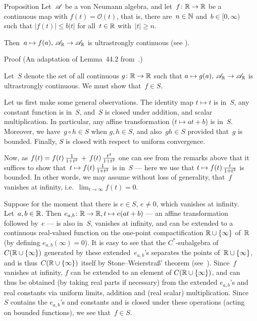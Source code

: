 \documentclass[a]{subfiles}
\begin{document}
\begin{parsec}%
\begin{point}{Proposition}%
Let~$\mathscr{A}$ be a von Neumann algebra,
and let~$f\colon \mathbb{R}\to\mathbb{R}$ be a continuous map 
with $f(t)=\mathcal{O}(t)$,
that is,
there are~$n\in \mathbb{N}$ and~$b\in [0,\infty)$
such that $\left|f(t)\right|\leq b\left|t\right|$
for all~$t\in \mathbb{R}$ with~$\left|t\right| \geq n$.

Then~$a\mapsto f(a),\,\mathscr{A}_{\mathbb{R}}\to\mathscr{A}_{\mathbb{R}}$ is ultrastrongly continuous
(see ).
\begin{point}{Proof}%
(An adaptation of Lemma~44.2 from~\cite{conway2000}.)

Let~$S$ denote the set of all continuous $g\colon \mathbb{R}\to\mathbb{R}$
such that $a\mapsto g(a),\,\mathscr{A}_{\mathbb{R}}\to\mathscr{A}_{\mathbb{R}}$
is ultrastrongly continuous.
We must show that~$f\in S$.

Let us first make some general observations.
The identity map $t\mapsto t$ is in~$S$,
any constant function is in~$S$,
and~$S$ is closed under addition,
and scalar multiplication.
In particular, any affine transformation ($t\mapsto at+b$)
is in~$S$.
Moreover, we have~$g\circ h\in S$ when $g,h\in S$,
and also~$gh\in S$
provided that~$g$ is bounded.
Finally, $S$ is closed with respect to uniform convergence.

Now,
as $f(t)=f(t)\,\smash{\frac{1}{1+t^2}\,+\, f(t)\,\frac{t^2}{1+t^2}}$
 one can see from the remarks above
that it suffices
to show
that~$t\mapsto f(t)\,\smash{\frac{1}{1+t^2}}$ is in~$S$
--- here we use that $t\mapsto f(t) \,\smash{\frac{t}{1+t^2}}$ is bounded.
In other words,
we may assume without loss of generality,
that~$f$ vanishes at infinity, i.e.~$\lim_{t\to \infty}f(t)=0$.

Suppose for the moment
that there is $e\in S$, $e\neq 0$,
which vanishes at infinity.
Let~$a,b\in \mathbb{R}$.
Then $e_{a,b}\colon \mathbb{R}\to\mathbb{R}, t\mapsto e(at+b)$
--- an affine transformation followed by~$e$ ---
is also in~$S$,
vanishes at infinity,
and can be extended to a continuous real-valued
function on the one-point compactification $\mathbb{R}\cup \{ \infty\}$
of~$\mathbb{R}$
(by defining $e_{a,b}(\infty)=0$).
It is easy to see that the $C^*$-subalgebra
of~$C(\mathbb{R}\cup\{\infty\})$
generated by these extended~$e_{a,b}$'s 
separates the points of~$\mathbb{R}\cup\{\infty\}$,
and is thus~$C(\mathbb{R}\cup\{\infty\})$ itself
by Stone--Weierstra\ss' theorem (see~).
Since~$f$ vanishes at infinity,
$f$ can be extended to an element of $C(\mathbb{R}\cup\{\infty\})$,
 and can thus be obtained
(by taking real parts if necessary)
from the extended $e_{a,b}$'s and real constants 
via uniform limits, addition and (real scalar)
multiplication. 
Since~$S$ contains the $e_{a,b}$'s and constants
and is closed under these operations (acting on bounded functions),
we see that~$f\in S$.


\end{point}
\end{point}
\end{parsec}
\end{document}
